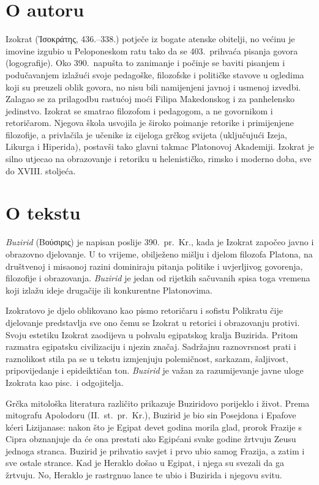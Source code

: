 \section*{O autoru}

Izokrat (Ἰσοκράτης, 436.–338.) potječe iz bogate atenske obitelji, no većinu je imovine izgubio u Peloponeskom ratu tako da se 403.\ prihvaća pisanja govora (logografije). Oko 390.\ napušta to zanimanje i počinje se baviti pisanjem i podučavanjem izlažući svoje pedagoške, filozofske i političke stavove u ogledima koji su preuzeli oblik govora, no nisu bili namijenjeni javnoj i usmenoj izvedbi. Zalagao se za prilagodbu rastućoj moći Filipa Makedonskog i za panhelensko jedinstvo. Izokrat se smatrao filozofom i pedagogom, a ne govornikom i retoričarom. Njegova škola usvojila je široko poimanje retorike i primijenjene filozofije, a privlačila je učenike iz cijeloga grčkog svijeta (uključujući Izeja, Likurga i Hiperida), postavši tako glavni takmac Platonovoj Akademiji. Izokrat je silno utjecao na obrazovanje i retoriku u helenističko, rimsko i moderno doba, sve do XVIII. stoljeća.

\section*{O tekstu}

\textit{Buzirid} (Βούσιρις) je napisan poslije 390.\ pr.~Kr., kada je Izokrat započeo javno i obrazovno djelovanje. U to vrijeme, obilježeno mišlju i djelom filozofa Platona, na društvenoj i misaonoj razini dominiraju pitanja politike i uvjerljivog govorenja, filozofije i obrazovanja. \textit{Buzirid} je jedan od rijetkih sačuvanih spisa toga vremena koji izlažu ideje drugačije ili konkurentne Platonovima. 

Izokratovo je djelo oblikovano kao pismo retoričaru i sofistu Polikratu čije djelovanje predstavlja sve ono čemu se Izokrat u retorici i obrazovanju protivi. Svoju estetiku Izokrat zaodijeva u pohvalu egipatskog kralja Buzirida. Pritom razmatra egipatsku civilizaciju i njezin značaj. Sadržajnu raznovrsnost prati i raznolikost stila pa se u tekstu izmjenjuju polemičnost, sarkazam, šaljivost, pripovijedanje i epideiktičan ton. \textit{Buzirid} je važan za razumijevanje javne uloge Izokrata kao pisc.\ i odgojitelja.

Grčka mitološka literatura različito prikazuje Buziridovo porijeklo i život. Prema mitografu Apolodoru (II.~st.\ pr.~Kr.), Buzirid je bio sin Posejdona i Epafove kćeri Lizijanase: nakon što je Egipat devet godina morila glad, prorok Frazije s Cipra obznanjuje da će ona prestati ako Egipćani svake godine žrtvuju Zeusu jednoga stranca. Buzirid je prihvatio savjet i prvo ubio samog Frazija, a zatim i sve ostale strance. Kad je Heraklo došao u Egipat, i njega su svezali da ga žrtvuju. No, Heraklo je rastrgnuo lance te ubio i Buzirida i njegovu svitu. 

